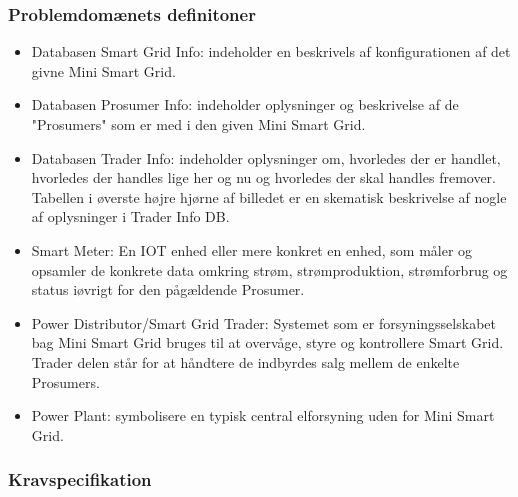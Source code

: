 \subsubsection{Problemdomænets definitoner}
\begin{itemize}
    \item Databasen Smart Grid Info: indeholder en beskrivels af konfigurationen af det givne Mini Smart Grid.
    \item Databasen Prosumer Info: indeholder oplysninger og beskrivelse af de "Prosumers" som er med i den given Mini Smart Grid.
    \item Databasen Trader Info: indeholder oplysninger om, hvorledes der er handlet, hvorledes der handles lige her og nu og hvorledes der skal handles fremover. Tabellen i øverste højre hjørne af billedet er en skematisk beskrivelse af nogle af oplysninger i Trader Info DB.
    \item Smart Meter: En IOT enhed eller mere konkret en enhed, som måler og opsamler de konkrete data omkring strøm, strømproduktion, strømforbrug og status iøvrigt for den pågældende Prosumer.
    \item Power Distributor/Smart Grid Trader: Systemet som er forsyningsselskabet bag Mini Smart Grid bruges til at overvåge, styre og kontrollere Smart Grid. Trader delen står for at håndtere de indbyrdes salg mellem de enkelte Prosumers.
    \item Power Plant: symbolisere en typisk central elforsyning uden for Mini Smart Grid.
\end{itemize}

\subsubsection{Kravspecifikation}

